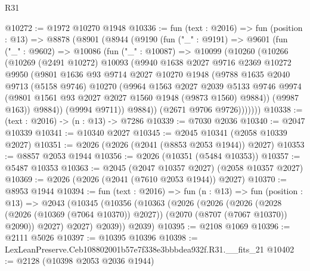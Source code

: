 \begin{lexlean}{R31}
\begin{coremodule}
@10272 := @1972 @10270 @1948
@10336 := fun (text : @2016) =>
  fun (position : @13) =>
  @8878
    (@8901
      (@8944
        (@9190
          (fun ("_" : @9191) =>
          @9601
            (fun ("_" : @9602) =>
            @10086
              (fun ("_" : @10087) =>
              @10099
                (@10260
                  (@10266
                    (@10269
                      (@2491 @10272)
                      @10093
                      (@9940
                        @1638
                        @2027
                        @9716
                        @2369
                        @10272
                        @9950
                        (@9801
                          @1636
                          @93
                          @9714
                          @2027
                          @10270
                          @1948
                          (@9788
                            @1635
                            @2040
                            @9713
                            (@5158 @9746)
                            @10270
                            (@9964
                              @1563
                              @2027
                              @2039
                              @5133
                              @9746
                              @9974
                              (@9801 @1561 @93 @2027 @2027 @1560 @1948 (@9873 @1560) @9884))
                            (@9987 @163))
                          @9884))
                      (@9994 @9711))
                    @9884))
                (@2671 @9706 @9726)))))))
@10338 := (text : @2016) -> (n : @13) -> @7286
@10339 := @7030 @2036
@10340 := @2047 @10339
@10341 := @10340 @2027
@10345 := @2045 @10341 (@2058 @10339 @2027)
@10351 := @2026 (@2026 (@2041 (@8853 @2053 @1944)) @2027)
@10353 := @8857 @2053 @1944
@10356 := @2026 (@10351 (@5484 @10353))
@10357 := @5487 @10353
@10363 := @2045 (@2047 @10357 @2027) (@2058 @10357 @2027)
@10369 := @2026 (@2026 (@2041 (@7610 @2053 @1944)) @2027)
@10370 := @8953 @1944
@10394 := fun (text : @2016) =>
  fun (n : @13) =>
  fun (position : @13) =>
  @2043
    (@10345
      (@10356
        (@10363
          (@2026
            (@2026
              (@2026
                (@2028 (@2026 (@10369 (@7064 @10370)) @2027))
                (@2070 (@8707 (@7067 @10370)) @2090))
              @2027)
            @2027)
          @2039))
      @2039)
@10395 := @2108 @1069
@10396 := @2111 @5026
@10397 := @10395 @10396
@10398 := LexLeanPreserve.Ceb108802001b57e7f338e3bbbdea932f.R31.__fits_21
@10402 := @2128 (@10398 @2053 @2036 @1944)

\end{coremodule}
\end{lexlean}
